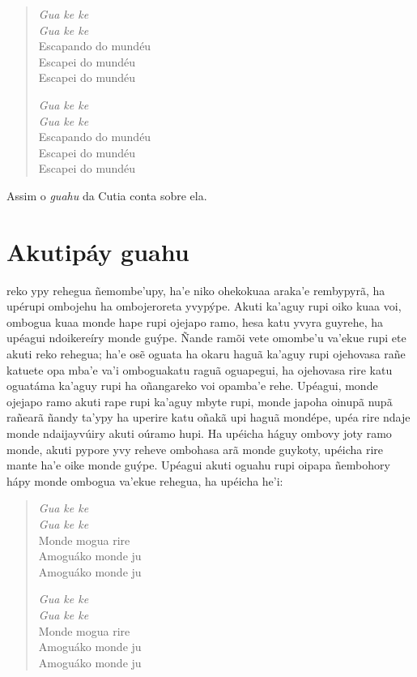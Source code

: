 \begin{verse}
\textit{Gua ke ke}\\
\textit{Gua ke ke}\\
Escapando do mundéu\\
Escapei do mundéu\\
Escapei do mundéu

\textit{Gua ke ke}\\
\textit{Gua ke ke}\\
Escapando do mundéu\\
Escapei do mundéu\\
Escapei do mundéu  
\end{verse}

Assim o \textit{guahu} da Cutia conta sobre ela.

\chapter{Akutipáy guahu}

 reko ypy rehegua ñemombe'upy, ha'e niko ohekokuaa araka'e
rembypyrã, ha upérupi ombojehu ha ombojeroreta yvypýpe. Akuti ka'aguy
rupi oiko kuaa voi, ombogua kuaa monde hape rupi ojejapo ramo, hesa katu
yvyra guyrehe, ha upéagui ndoikereíry monde guýpe. Ñande ramõi vete
omombe'u va'ekue rupi ete akuti reko rehegua; ha'e osẽ oguata ha okaru
haguã ka'aguy rupi ojehovasa rañe katuete opa mba'e va'i omboguakatu
raguã oguapegui, ha ojehovasa rire katu oguatáma ka'aguy rupi ha
oñangareko voi opamba'e rehe. Upéagui, monde ojejapo ramo akuti rape
rupi ka'aguy mbyte rupi, monde japoha oinupã nupã rañearã ñandy ta'ypy
ha uperire katu oñakã upi haguã mondépe, upéa rire ndaje monde
ndaijayvúiry akuti oúramo hupi. Ha upéicha háguy ombovy joty ramo monde,
akuti pypore yvy reheve ombohasa arã monde guykoty, upéicha rire mante
ha'e oike monde guýpe. Upéagui akuti oguahu rupi oipapa ñembohory hápy
monde ombogua va'ekue rehegua, ha upéicha he'i:

\begin{verse}
\textit{Gua ke ke}\\
\textit{Gua ke ke}\\
Monde mogua rire\\
Amoguáko monde ju\\
Amoguáko monde ju
       
\textit{Gua ke ke}\\
\textit{Gua ke ke}\\
Monde mogua rire\\
Amoguáko monde ju\\ \EP[1]
Amoguáko monde ju 
\end{verse}

